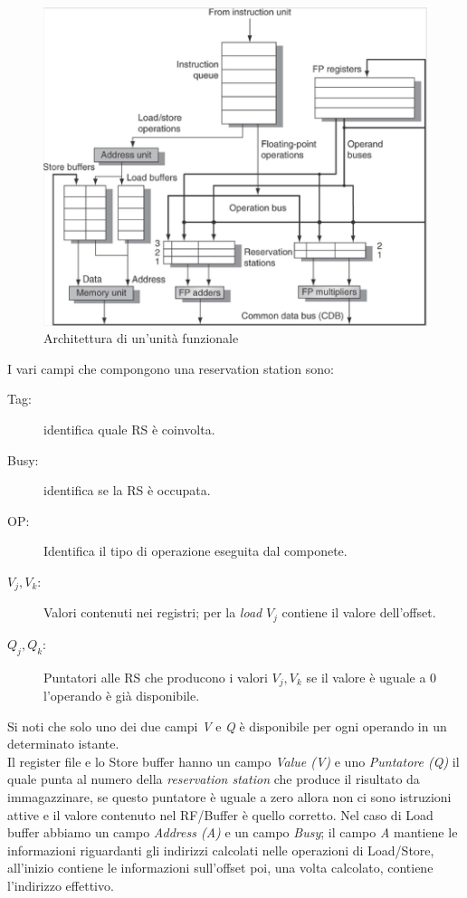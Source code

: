 \begin{figure}
\centering
\includegraphics[scale=0.5]{img/fuhw.png}
\caption{Architettura di un'unità funzionale}\label{fig:fuhw}
\end{figure}
I vari campi che compongono una reservation station sono:
\begin{description}
\item[Tag:] identifica quale RS è coinvolta.
\item[Busy:] identifica se la RS è occupata.
\item[OP:] Identifica il tipo di operazione eseguita dal componete.
\item[$V_j,V_k$:] Valori contenuti nei registri; per la \emph{load}  $V_j$ contiene il valore dell'offset.
\item[$Q_j,Q_k$:] Puntatori alle RS che producono i valori $V_j,V_k$ se il valore è uguale a 0 l'operando è già disponibile. 
\end{description}
Si noti che solo uno dei due campi \emph{V} e \emph{Q} è disponibile per ogni operando in un determinato istante.\\
Il register file e lo Store buffer hanno un campo \emph{Value (V)} e uno \emph{Puntatore (Q)} il quale punta al numero della \emph{reservation station} che produce il risultato da immagazzinare, se questo puntatore è uguale a zero allora non ci sono istruzioni attive e il valore contenuto nel RF/Buffer è quello corretto.
Nel caso di Load buffer abbiamo un campo \emph{Address (A)} e un campo \emph{Busy}; il campo \emph{A} mantiene le informazioni riguardanti gli indirizzi calcolati nelle operazioni di Load/Store, all'inizio contiene le informazioni sull'offset poi, una volta calcolato, contiene l'indirizzo effettivo.
